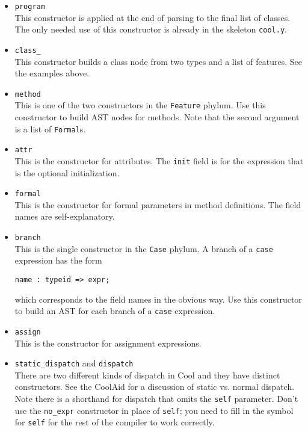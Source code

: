 \begin{itemize}
\item {\tt program} \\
This constructor is applied at the end of parsing to the final list of classes.
The only needed use of this constructor is already  in the skeleton {\tt cool.y}.

\item {\tt class\_} \\
This constructor builds a class node from two types and a list of features.
See the examples above.

\item {\tt method} \\
This is one of the two constructors in the {\tt Feature} phylum.  Use
this constructor to build AST nodes for methods.  Note that the second
argument is a list of {\tt Formal}s.

\item {\tt attr} \\
This is the constructor for attributes.  The {\tt init} field is for the expression
that is the optional initialization.

\item {\tt formal} \\
This is the constructor for formal parameters in method definitions.  The field names are
self-explanatory.

\item {\tt branch} \\
This is the single constructor in the {\tt Case} phylum.  A branch of a {\tt case}
expression has the form
\begin{verbatim}
name : typeid => expr;
\end{verbatim}
which corresponds to the field names in the obvious way.  Use this constructor
to build an AST for each branch of a {\tt case} expression.

\item {\tt assign} \\
This is the constructor for assignment expressions.

\item {\tt static\_dispatch} and {\tt dispatch} \\
There are two different kinds of dispatch in Cool and they have distinct constructors.
See the CoolAid for a discussion of static vs. normal dispatch.  Note
there is a shorthand for dispatch that omits the {\tt self} parameter. Don't
use the {\tt no\_expr} constructor in place of {\tt self}; you need to fill in
the symbol for {\tt self} for the rest of the compiler to work correctly.


\end{itemize}
